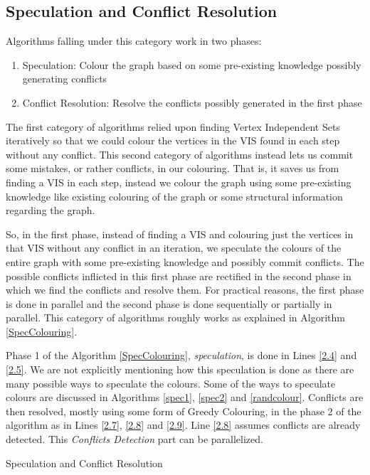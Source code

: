 \documentclass[MTech]{iitmdiss}
\makeatletter
\def\BState{\State\hskip-\ALG@thistlm}
\makeatother
\begin{document}
\subsection{Speculation and Conflict Resolution}
Algorithms falling under this category work in two phases:
\begin{enumerate}
\item Speculation: Colour the graph based on some pre-existing knowledge possibly generating conflicts
\item Conflict Resolution: Resolve the conflicts possibly generated in the first phase
\end{enumerate}
The first category of algorithms relied upon finding Vertex Independent Sets iteratively so that we could colour the vertices in the VIS found in each step without any conflict. This second category of algorithms instead lets us commit some mistakes, or rather conflicts, in our colouring. That is, it saves us from finding a VIS in each step, instead we colour the graph using some pre-existing knowledge like existing colouring of the graph or some structural information regarding the graph.

So, in the first phase, instead of finding a VIS and colouring just the vertices in that VIS without any conflict in an iteration, we speculate the colours of the entire graph with some pre-existing knowledge and possibly commit conflicts. The possible conflicts inflicted in this first phase are rectified in the second phase in which we find the conflicts and resolve them. For practical reasons, the first phase is done in parallel and the second phase is done sequentially or partially in parallel. This category of algorithms roughly works as explained in Algorithm \ref{SpecColouring}.

Phase 1 of the Algorithm \ref{SpecColouring}, \textit{speculation}, is done in Lines \ref{2.4} and \ref{2.5}. We are not explicitly mentioning how this speculation is done as there are many possible ways to speculate the colours. Some of the ways to speculate colours are discussed in Algorithms \ref{spec1}, \ref{spec2} and \ref{randcolour}. Conflicts are then resolved, mostly using some form of Greedy Colouring, in the phase 2 of the algorithm as in Lines \ref{2.7}, \ref{2.8} and \ref{2.9}. Line \ref{2.8} assumes conflicts are already detected. This \textit{Conflicts Detection} part can be parallelized.

\begin{algorithm}
\caption{Speculation and Conflict Resolution}\label{SpecColouring}
\end{algorithm}
\end{document}
